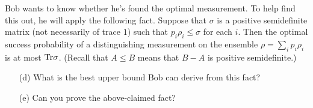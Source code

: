 \documentclass[12pt]{article}
\begin{document}
\begin{enumerate}
\begin{enumerate}
\end{enumerate}
Bob wants to know whether he's found the optimal measurement. To help find this out, he will apply the following fact. Suppose that $\sigma$ is a positive semidefinite matrix (not necessarily of trace $1$) such that $p_i\rho_i \leq \sigma$ for each $i$. Then the optimal success probability of a distinguishing measurement on the ensemble $\rho = \sum_ip_i\rho_i$ is at most $\mathrm{Tr}\sigma$. (Recall that $A\leq B$ means that $B-A$ is positive semidefinite.)
\begin{enumerate}
\item[(d)] What is the best upper bound Bob can derive from this fact?
\item[(e)] Can you prove the above-claimed fact?
\end{enumerate}


\end{enumerate}
\end{document}
